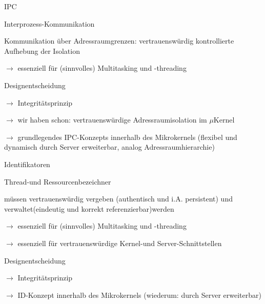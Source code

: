 \documentclass[a4paper]{article}
\begin{document}
\begin{multicols}{3}
    IPC

    \begin{itemize*}
        \item
        Interprozess-Kommunikation
        \begin{itemize*}
            \item Kommunikation über Adressraumgrenzen: vertrauenswürdig kontrollierte Aufhebung der Isolation
            \item $\rightarrow$ essenziell für (sinnvolles) Multitasking und -threading
        \end{itemize*}
        \item
        Designentscheidung
        \begin{itemize*}
            \item $\rightarrow$ Integritätsprinzip
            \item $\rightarrow$ wir haben schon: vertrauenswürdige Adressraumisolation im $\mu$Kernel
            \item $\rightarrow$ grundlegendes IPC-Konzepts innerhalb des Mikrokernels (flexibel und dynamisch durch Server erweiterbar, analog Adressraumhierarchie)
        \end{itemize*}
    \end{itemize*}

    Identifikatoren

    \begin{itemize*}
        \item
        Thread-und Ressourcenbezeichner
        \begin{itemize*}
            \item müssen vertrauenswürdig vergeben (authentisch und i.A. persistent) und verwaltet(eindeutig und korrekt referenzierbar)werden
            \item $\rightarrow$ essenziell für (sinnvolles) Multitasking und -threading
            \item $\rightarrow$ essenziell für vertrauenswürdige Kernel-und Server-Schnittstellen
        \end{itemize*}
        \item
        Designentscheidung
        \begin{itemize*}
            \item $\rightarrow$ Integritätsprinzip
            \item $\rightarrow$ ID-Konzept innerhalb des Mikrokernels (wiederum: durch Server erweiterbar)
        \end{itemize*}
    \end{itemize*}


\end{multicols}
\end{document}
